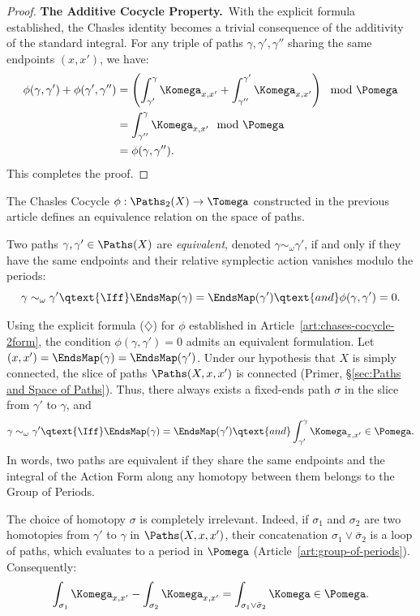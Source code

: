 \begin{proof}
\textbf{The Additive Cocycle Property.}~With the explicit formula established,
the Chasles identity becomes a trivial consequence of the additivity of the standard integral.
For any triple of paths $\gamma, \gamma', \gamma''$ sharing the same endpoints $(x,x')$,
we have:
\begin{align*}
  \phi(\gamma,\gamma') + \phi(\gamma',\gamma'') &= \left( \int_{\gamma'}^{\gamma} \Komega_{x,x'} + \int_{\gamma''}^{\gamma'} \Komega_{x,x'} \right) \mod \Pomega \\
  &= \int_{\gamma''}^{\gamma} \Komega_{x,x'} \mod \Pomega \\
  &= \phi(\gamma,\gamma'').
\end{align*}
This completes the proof.
\end{proof}

\begin{article}
  \label{art:equivalence-relation}
  The Chasles Cocycle $\phi: \Paths_2(X) \to \Tomega$ constructed in the
  previous article defines an equivalence relation on the space of paths.
  
  \begin{definition}
    Two paths $\gamma, \gamma' \in \Paths(X)$ are \emph{equivalent},
    denoted $\gamma \sim_\omega \gamma'$,
    if and only if they have the same endpoints and their relative
    symplectic action vanishes modulo the periods:
    \[
      \gamma \sim_\omega \gamma'
      \qtext{\Iff}
      \EndsMap(\gamma) = \EndsMap(\gamma')
      \qtext{and}
      \phi(\gamma,\gamma') = 0.
      \]
  \end{definition}
  
  Using the explicit formula ($\diamondsuit$) for $\phi$ established in
  Article~\ref{art:chases-cocycle-2form},
  the condition $\phi(\gamma,\gamma') = 0$ admits an equivalent
  formulation.
  Let $(x,x') = \EndsMap(\gamma) = \EndsMap(\gamma')$.
  Under our hypothesis that $X$ is simply connected, the slice of paths
  $\Paths(X,x,x')$ is connected (Primer, \S\ref{sec:Paths and Space of Paths}).
  Thus, there always exists a fixed-ends path $\sigma$ in the slice
  from $\gamma'$ to $\gamma$, and
  \[
    \gamma \sim_\omega \gamma'
    \qtext{\Iff}
    \EndsMap(\gamma) = \EndsMap(\gamma')
    \qtext{and}
    \int_{\gamma'}^\gamma \Komega_{x,x'} \in \Pomega.
    \]
  In words,
  two paths are equivalent if they share the same endpoints
  and the integral of the Action Form along any homotopy between them
  belongs to the Group of Periods.
  
  The choice of homotopy $\sigma$ is completely irrelevant.
  Indeed, if $\sigma_1$ and $\sigma_2$ are two homotopies from $\gamma'$ to $\gamma$ in $\Paths(X,x,x')$,
  their concatenation $\sigma_1 \vee \bar{\sigma}_2$ is a loop of paths,
  which evaluates to a period in $\Pomega$ (Article~\ref{art:group-of-periods}).
  Consequently:
  \[
    \int_{\sigma_1} \Komega_{x,x'} - \int_{\sigma_2} \Komega_{x,x'} = \int_{\sigma_1 \vee \bar{\sigma}_2} \Komega \in \Pomega.
    \]
\end{article}

